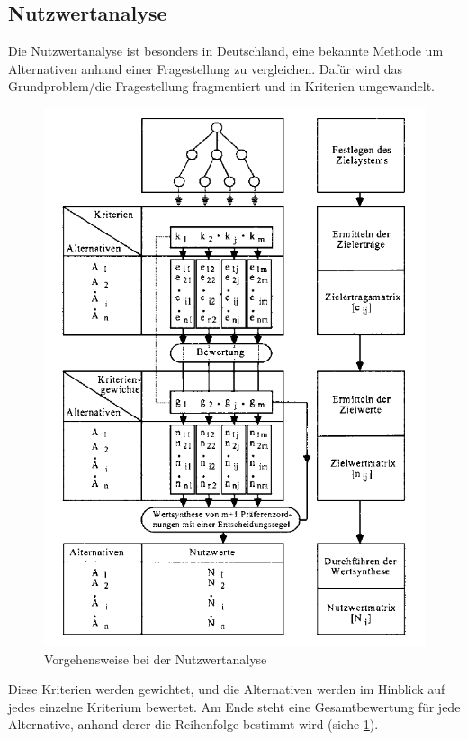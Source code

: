 \subsection{Nutzwertanalyse}\label{nutz}
Die Nutzwertanalyse ist besonders in Deutschland, eine bekannte Methode um Alternativen anhand einer Fragestellung zu vergleichen. Dafür wird das Grundproblem/die Fragestellung fragmentiert und in Kriterien umgewandelt.
\begin{figure}[h!]
	\centering
	\includegraphics[scale = 0.7]{img/NUTZ.png}
	\caption{Vorgehensweise bei der Nutzwertanalyse}
	\label{img:nutz}
\end{figure}
Diese Kriterien werden gewichtet, und die Alternativen werden im Hinblick auf jedes einzelne Kriterium bewertet.\autocite[Vgl.][S.6]{Kuehnapfel.2014} Am Ende steht eine Gesamtbewertung für jede Alternative, anhand derer die Reihenfolge bestimmt wird (siehe \ref{img:nutz}).\\
